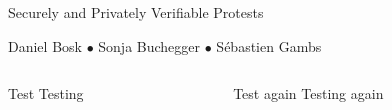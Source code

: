 \begin{center}
  \Huge Securely and Privately Verifiable Protests
\end{center}
\begin{center}
  Daniel Bosk $\bullet$ Sonja Buchegger $\bullet$ Sébastien Gambs
\end{center}
\vspace{1.5em}

\begin{columns}

  \begin{column}{0.49\linewidth}

    \begin{block}{Test}
      Testing
    \end{block}

  \end{column}
  \hfill
  \begin{column}{0.49\linewidth}

    \begin{block}{Test again}
      Testing again
    \end{block}

  \end{column}

\end{columns}

